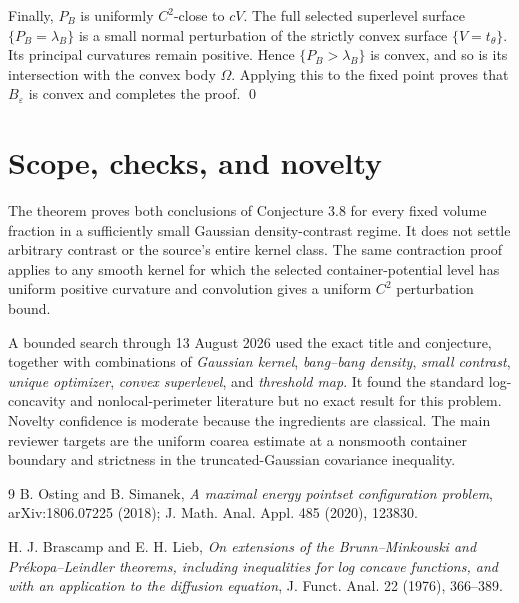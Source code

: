 \documentclass[11pt]{article}
\newcommand{\1}{\mathbf 1}
\begin{document}
Finally, $P_B$ is uniformly $C^2$-close to $cV$.  The full selected
superlevel surface $\{P_B=\lambda_B\}$ is a small normal perturbation of the
strictly convex surface $\{V=t_\theta\}$.  Its principal curvatures remain
positive.  Hence $\{P_B>\lambda_B\}$ is convex, and so is its intersection
with the convex body $\Omega$.  Applying this to the fixed point proves that
$B_\varepsilon$ is convex and completes the proof. \qed

\section{Scope, checks, and novelty}

The theorem proves both conclusions of Conjecture 3.8 for every fixed volume
fraction in a sufficiently small Gaussian density-contrast regime.  It does
not settle arbitrary contrast or the source's entire kernel class.  The same
contraction proof applies to any smooth kernel for which the selected
container-potential level has uniform positive curvature and convolution
gives a uniform $C^2$ perturbation bound.

A bounded search through 13 August 2026 used the exact title and conjecture,
together with combinations of \emph{Gaussian kernel}, \emph{bang--bang
density}, \emph{small contrast}, \emph{unique optimizer}, \emph{convex
superlevel}, and \emph{threshold map}.  It found the standard log-concavity
and nonlocal-perimeter literature but no exact result for this problem.
Novelty confidence is moderate because the ingredients are classical.  The
main reviewer targets are the uniform coarea estimate at a nonsmooth container
boundary and strictness in the truncated-Gaussian covariance inequality.

\begin{thebibliography}{9}
B. Osting and B. Simanek,
\emph{A maximal energy pointset configuration problem},
arXiv:1806.07225 (2018); J. Math. Anal. Appl. 485 (2020), 123830.

H. J. Brascamp and E. H. Lieb,
\emph{On extensions of the Brunn--Minkowski and Pr\'ekopa--Leindler theorems,
including inequalities for log concave functions, and with an application to
the diffusion equation}, J. Funct. Anal. 22 (1976), 366--389.
\end{thebibliography}
\end{document}
